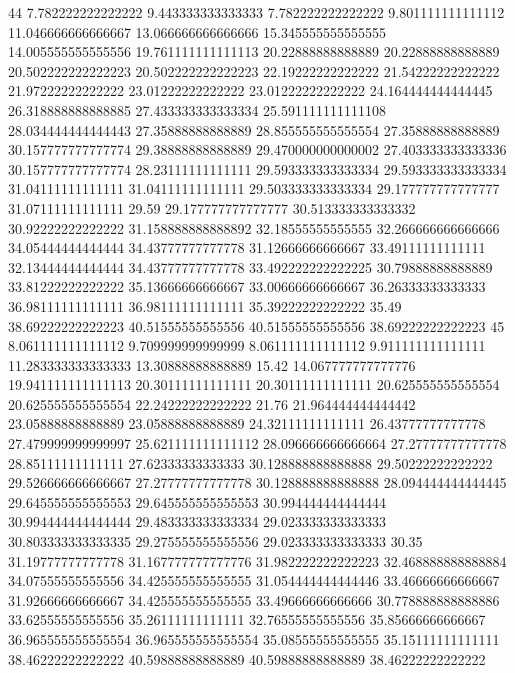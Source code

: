44 7.782222222222222 9.443333333333333 7.782222222222222 9.801111111111112 11.046666666666667 13.066666666666666 15.345555555555555 14.005555555555556 19.761111111111113 20.22888888888889 20.22888888888889 20.502222222222223 20.502222222222223 22.19222222222222 21.54222222222222 21.97222222222222 23.01222222222222 23.01222222222222 24.164444444444445 26.318888888888885 27.433333333333334 25.591111111111108 28.034444444444443 27.35888888888889 28.855555555555554 27.35888888888889 30.157777777777774 29.38888888888889 29.470000000000002 27.403333333333336 30.157777777777774 28.23111111111111 29.593333333333334 29.593333333333334 31.04111111111111 31.04111111111111 29.503333333333334 29.177777777777777 31.07111111111111 29.59 29.177777777777777 30.513333333333332 30.92222222222222 31.158888888888892 32.18555555555555 32.266666666666666 34.05444444444444 34.43777777777778 31.12666666666667 33.49111111111111 32.13444444444444 34.43777777777778 33.492222222222225 30.79888888888889 33.81222222222222 35.13666666666667 33.00666666666667 36.26333333333333 36.98111111111111 36.98111111111111 35.39222222222222 35.49 38.69222222222223 40.51555555555556 40.51555555555556 38.69222222222223
45 8.061111111111112 9.709999999999999 8.061111111111112 9.911111111111111 11.283333333333333 13.30888888888889 15.42 14.067777777777776 19.941111111111113 20.30111111111111 20.30111111111111 20.625555555555554 20.625555555555554 22.24222222222222 21.76 21.964444444444442 23.05888888888889 23.05888888888889 24.32111111111111 26.43777777777778 27.479999999999997 25.621111111111112 28.096666666666664 27.27777777777778 28.85111111111111 27.62333333333333 30.128888888888888 29.50222222222222 29.526666666666667 27.27777777777778 30.128888888888888 28.094444444444445 29.645555555555553 29.645555555555553 30.994444444444444 30.994444444444444 29.483333333333334 29.023333333333333 30.803333333333335 29.275555555555556 29.023333333333333 30.35 31.19777777777778 31.167777777777776 31.982222222222223 32.468888888888884 34.07555555555556 34.425555555555555 31.054444444444446 33.46666666666667 31.92666666666667 34.425555555555555 33.49666666666666 30.778888888888886 33.62555555555556 35.26111111111111 32.76555555555556 35.85666666666667 36.965555555555554 36.965555555555554 35.08555555555555 35.15111111111111 38.46222222222222 40.59888888888889 40.59888888888889 38.46222222222222

